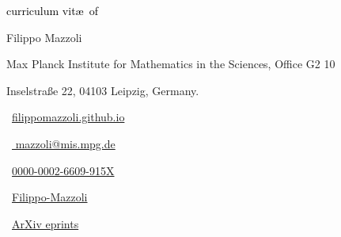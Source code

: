 \begin{scriptsize}
	 \textcolor{black}{curriculum vit\ae~of}
\end{scriptsize}

\begin{Large} 
	Filippo Mazzoli
\end{Large}

\vspace*{0.4em}
\begin{scshape}
	\begin{scriptsize}
		  \textcolor{highlight2}{Max Planck Institute for Mathematics in the Sciences, Office G2 10}
		  
		  \vspace*{-1ex}
		  \textcolor{highlight2}{Inselstraße 22,
		  	04103 Leipzig, Germany.}
	\end{scriptsize}
\end{scshape}
\vspace*{0.25cm}

\begin{footnotesize}
	\begin{tiny}\faHome\end{tiny}~\href{https://filippomazzoli.github.io}
	{filippomazzoli.github.io
	}
	\quad \begin{tiny}\faEnvelope[regular]\end{tiny}~\href{mailto:mazzoli@mis.mpg.de}{%
		mazzoli@mis.mpg.de
	} 
	
	
	\begin{tiny}\aiOrcid\end{tiny}~\href{https://orcid.org/0000-0002-6609-915X}{0000-0002-6609-915X}
	\quad 
	\begin{tiny}\aiResearchGate\end{tiny}~\href{https://www.researchgate.net/profile/Filippo-Mazzoli}{Filippo-Mazzoli}
		\quad
	\begin{tiny}\aiarXiv\end{tiny}~\href{https://arxiv.org/a/0000-0002-6609-915X.html}{ArXiv eprints}
	

\end{footnotesize}